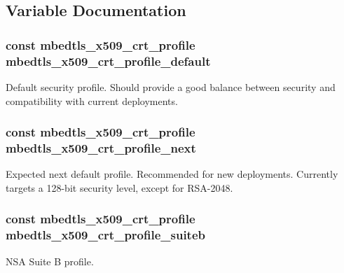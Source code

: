 \subsection{Variable Documentation}
\hypertarget{group__x509__module_ga9cd2de10ffeff0f339abcc1ba7e26fdf}{
\subsubsection[{mbedtls\-\_\-x509\-\_\-crt\-\_\-profile\-\_\-default}]{\setlength{\rightskip}{0pt plus 5cm}const {\bf mbedtls\-\_\-x509\-\_\-crt\-\_\-profile} mbedtls\-\_\-x509\-\_\-crt\-\_\-profile\-\_\-default}}\label{group__x509__module_ga9cd2de10ffeff0f339abcc1ba7e26fdf}
Default security profile. Should provide a good balance between security and compatibility with current deployments. \hypertarget{group__x509__module_ga8ab1f8a044fd25f76ecb4ba15c6d5bcd}{
\subsubsection[{mbedtls\-\_\-x509\-\_\-crt\-\_\-profile\-\_\-next}]{\setlength{\rightskip}{0pt plus 5cm}const {\bf mbedtls\-\_\-x509\-\_\-crt\-\_\-profile} mbedtls\-\_\-x509\-\_\-crt\-\_\-profile\-\_\-next}}\label{group__x509__module_ga8ab1f8a044fd25f76ecb4ba15c6d5bcd}
Expected next default profile. Recommended for new deployments. Currently targets a 128-\/bit security level, except for R\-S\-A-\/2048. \hypertarget{group__x509__module_gaf09067a39129236125e353a68ceb45d6}{
\subsubsection[{mbedtls\-\_\-x509\-\_\-crt\-\_\-profile\-\_\-suiteb}]{\setlength{\rightskip}{0pt plus 5cm}const {\bf mbedtls\-\_\-x509\-\_\-crt\-\_\-profile} mbedtls\-\_\-x509\-\_\-crt\-\_\-profile\-\_\-suiteb}}\label{group__x509__module_gaf09067a39129236125e353a68ceb45d6}
N\-S\-A Suite B profile. 
